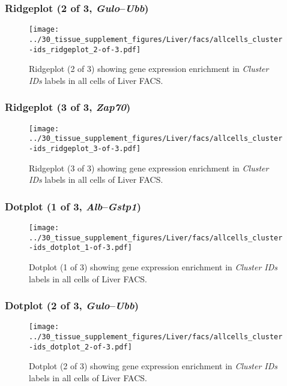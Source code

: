 \clearpage

\subsubsection{Ridgeplot (2 of 3, \emph{Gulo}--\emph{Ubb})}
\begin{figure}[h]
\centering
\texttt{[image: ../30\_tissue\_supplement\_figures/Liver/facs/allcells\_cluster-ids\_ridgeplot\_2-of-3.pdf]}

\caption{ Ridgeplot (2 of 3)  showing gene expression enrichment in \emph{Cluster IDs} labels in all cells of Liver FACS. }
\end{figure}


\clearpage

\subsubsection{Ridgeplot (3 of 3, \emph{Zap70})}
\begin{figure}[h]
\centering
\texttt{[image: ../30\_tissue\_supplement\_figures/Liver/facs/allcells\_cluster-ids\_ridgeplot\_3-of-3.pdf]}

\caption{ Ridgeplot (3 of 3)  showing gene expression enrichment in \emph{Cluster IDs} labels in all cells of Liver FACS. }
\end{figure}


\clearpage

\subsubsection{Dotplot (1 of 3, \emph{Alb}--\emph{Gstp1})}
\begin{figure}[h]
\centering
\texttt{[image: ../30\_tissue\_supplement\_figures/Liver/facs/allcells\_cluster-ids\_dotplot\_1-of-3.pdf]}

\caption{ Dotplot (1 of 3)  showing gene expression enrichment in \emph{Cluster IDs} labels in all cells of Liver FACS. }
\end{figure}


\clearpage

\subsubsection{Dotplot (2 of 3, \emph{Gulo}--\emph{Ubb})}
\begin{figure}[h]
\centering
\texttt{[image: ../30\_tissue\_supplement\_figures/Liver/facs/allcells\_cluster-ids\_dotplot\_2-of-3.pdf]}

\caption{ Dotplot (2 of 3)  showing gene expression enrichment in \emph{Cluster IDs} labels in all cells of Liver FACS. }
\end{figure}


